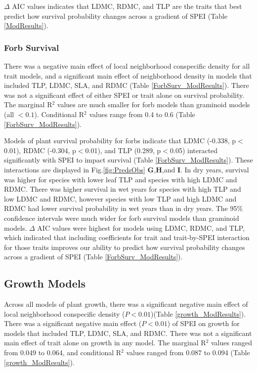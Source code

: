 \documentclass[12pt, letterpaper]{article}
\begin{document}
$\Delta$ AIC values indicates that LDMC, RDMC, and TLP are the traits that best predict how survival probability changes across a gradient of SPEI (Table \ref{ModResults}). 

\subsubsection{Forb Survival}
There was a negative main effect of local neighborhood conspecific density for all trait models, and a significant main effect of neighborhood density in models that included TLP, LDMC, SLA, and RDMC (Table \ref{ForbSurv_ModResults}). There was not a significant effect of either SPEI or trait alone on survival probability. The marginal R$^2$ values are much smaller for forb models than graminoid models (all $<0.1$). Conditional R$^2$ values range from 0.4 to 0.6 (Table \ref{ForbSurv_ModResults}).

Models of plant survival probability for forbs indicate that LDMC (-0.338, p$<$0.01), RDMC (-0.304, p$<$0.01), and TLP (0.289, p$<$0.05) interacted significantly with SPEI to impact survival (Table \ref{ForbSurv_ModResults}). These interactions are displayed in Fig.\ref{fig:PredsObs} \textbf{G},\textbf{H},and \textbf{I}. In dry years, survival was higher for species with lower leaf TLP and species with high LDMC and RDMC. There was higher survival in wet years for species with high TLP and low LDMC and RDMC, however species with low TLP and high LDMC and RDMC had lower survival probability in wet years than in dry years. The 95\% confidence intervals were much wider for forb survival models than graminoid models. $\Delta$ AIC values were highest for models using LDMC, RDMC, and TLP, which indicated that including coefficients for trait and trait-by-SPEI interaction for those traits improves our ability to predict how survival probability changes across a gradient of SPEI (Table \ref{ForbSurv_ModResults}). 


\subsection{Growth Models} 
 Across all models of plant growth, there was a significant negative main effect of local neighborhood conspecific density ($P<0.01$)(Table \ref{growth_ModResults}).  There was a significant negative main effect ($P<0.01$) of SPEI on growth for models that included TLP, LDMC, SLA, and RDMC. There was not a significant main effect of trait alone on growth in any model. The marginal R$^2$ values ranged from 0.049 to 0.064, and conditional R$^2$ values ranged from 0.087 to 0.094 (Table \ref{growth_ModResults}).
\end{document}
